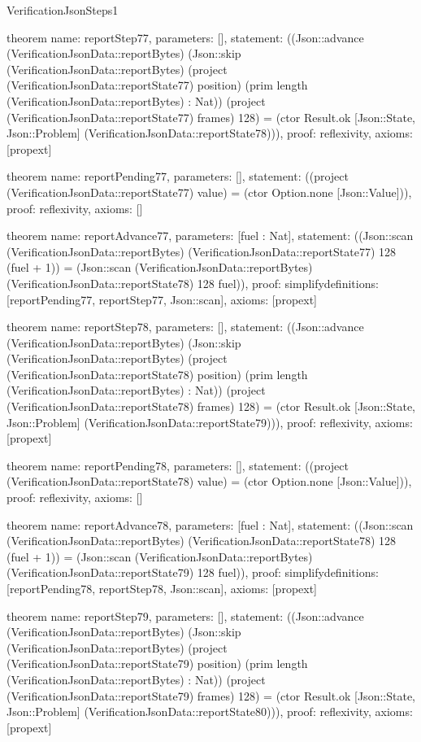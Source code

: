 \begin{lexlean}{VerificationJsonSteps1}
\begin{semanticmodule}
theorem{
  name: reportStep77,
  parameters: [],
  statement: ((Json::advance (VerificationJsonData::reportBytes) (Json::skip (VerificationJsonData::reportBytes) (project (VerificationJsonData::reportState77) position) (prim length (VerificationJsonData::reportBytes) : Nat)) (project (VerificationJsonData::reportState77) frames) 128) = (ctor Result.ok [Json::State, Json::Problem] (VerificationJsonData::reportState78))),
  proof: reflexivity{},
  axioms: [propext]
}

theorem{
  name: reportPending77,
  parameters: [],
  statement: ((project (VerificationJsonData::reportState77) value) = (ctor Option.none [Json::Value])),
  proof: reflexivity{},
  axioms: []
}

theorem{
  name: reportAdvance77,
  parameters: [fuel : Nat],
  statement: ((Json::scan (VerificationJsonData::reportBytes) (VerificationJsonData::reportState77) 128 (fuel + 1)) = (Json::scan (VerificationJsonData::reportBytes) (VerificationJsonData::reportState78) 128 fuel)),
  proof: simplify{definitions: [reportPending77, reportStep77, Json::scan]},
  axioms: [propext]
}

theorem{
  name: reportStep78,
  parameters: [],
  statement: ((Json::advance (VerificationJsonData::reportBytes) (Json::skip (VerificationJsonData::reportBytes) (project (VerificationJsonData::reportState78) position) (prim length (VerificationJsonData::reportBytes) : Nat)) (project (VerificationJsonData::reportState78) frames) 128) = (ctor Result.ok [Json::State, Json::Problem] (VerificationJsonData::reportState79))),
  proof: reflexivity{},
  axioms: [propext]
}

theorem{
  name: reportPending78,
  parameters: [],
  statement: ((project (VerificationJsonData::reportState78) value) = (ctor Option.none [Json::Value])),
  proof: reflexivity{},
  axioms: []
}

theorem{
  name: reportAdvance78,
  parameters: [fuel : Nat],
  statement: ((Json::scan (VerificationJsonData::reportBytes) (VerificationJsonData::reportState78) 128 (fuel + 1)) = (Json::scan (VerificationJsonData::reportBytes) (VerificationJsonData::reportState79) 128 fuel)),
  proof: simplify{definitions: [reportPending78, reportStep78, Json::scan]},
  axioms: [propext]
}

theorem{
  name: reportStep79,
  parameters: [],
  statement: ((Json::advance (VerificationJsonData::reportBytes) (Json::skip (VerificationJsonData::reportBytes) (project (VerificationJsonData::reportState79) position) (prim length (VerificationJsonData::reportBytes) : Nat)) (project (VerificationJsonData::reportState79) frames) 128) = (ctor Result.ok [Json::State, Json::Problem] (VerificationJsonData::reportState80))),
  proof: reflexivity{},
  axioms: [propext]
}


\end{semanticmodule}
\end{lexlean}
